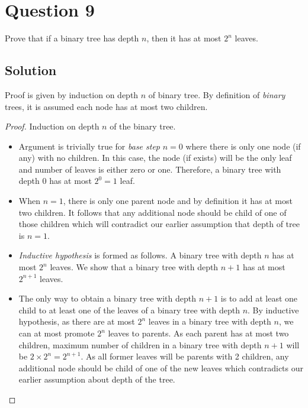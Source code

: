 
\section*{Question 9}

Prove that if a binary tree has depth $n$, then it has at most $2^n$ leaves.

\subsection*{Solution}

Proof is given by induction on depth $n$ of binary tree. By definition of \textit{binary} trees, it is assumed each node has at most two children.
\begin{proof}
Induction on depth $n$ of the binary tree.
\begin{itemize}
\item[] Argument is trivially true for \emph{base step} $n=0$ where there is only one node (if any) with no children. In this case, the node (if exists) will be the only leaf and number of leaves is either zero or one. Therefore, a binary tree with depth $0$ has at most $2^0=1$ leaf.
\item[] When $n=1$, there is only one parent node and by definition it has at most two children. It follows that any additional node should be child of one of those children which will contradict our earlier assumption that depth of tree is $n=1$.

\item[] \emph{Inductive hypothesis} is formed as follows. A binary tree with depth $n$ has at most $2^n$ leaves. We show that a binary tree with depth $n+1$ has at most $2^{n+1}$ leaves.

\item[] The only way to obtain a binary tree with depth $n+1$ is to add at least one child to at least one of the leaves of a binary tree with depth $n$. By inductive hypothesis, as there are at most $2^n$ leaves in a binary tree with depth $n$, we can at most promote $2^n$ leaves to parents. As each parent has at most two children, maximum number of children in a binary tree with depth $n+1$ will be $2 \times 2^n = 2^{n+1}$. As all former leaves will be parents with 2 children, any additional node should be child of one of the new leaves which contradicts our earlier assumption about depth of the tree.

\end{itemize}
\end{proof}
